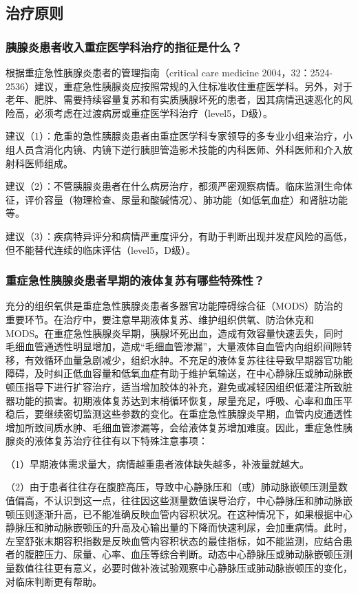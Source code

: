 \subsection{治疗原则}

\subsubsection{胰腺炎患者收入重症医学科治疗的指征是什么？}

根据重症急性胰腺炎患者的管理指南（critical care medicine
2004，32：2524-2536）建议，重症急性胰腺炎应按照常规的入住标准收住重症医学科。另外，对于老年、肥胖、需要持续容量复苏和有实质胰腺坏死的患者，因其病情迅速恶化的风险高，必须考虑在过渡病房或重症医学科治疗（level5，D级）。

建议（1）：危重的急性胰腺炎患者由重症医学科专家领导的多专业小组来治疗，小组人员含消化内镜、内镜下逆行胰胆管造影术技能的内科医师、外科医师和介入放射科医师组成。

建议（2）：不管胰腺炎患者在什么病房治疗，都须严密观察病情。临床监测生命体征，评价容量（物理检查、尿量和酸碱情况）、肺功能（如低氧血症）和肾脏功能等。

建议（3）：疾病特异评分和病情严重度评分，有助于判断出现并发症风险的高低，但不能替代连续的临床评估（level5，D级）。

\subsubsection{重症急性胰腺炎患者早期的液体复苏有哪些特殊性？}

充分的组织氧供是重症急性胰腺炎患者多器官功能障碍综合征（MODS）防治的重要环节。在治疗中，要注意早期液体复苏、维护组织供氧、防治休克和MODS。在重症急性胰腺炎早期，胰腺坏死出血，造成有效容量快速丢失，同时毛细血管通透性明显增加，造成“毛细血管渗漏”，大量液体自血管内向组织间隙转移，有效循环血量急剧减少，组织水肿。不充足的液体复苏往往导致早期器官功能障碍，及时纠正低血容量和低氧血症有助于维护氧输送，在中心静脉压或肺动脉嵌顿压指导下进行扩容治疗，适当增加胶体的补充，避免或减轻因组织低灌注所致脏器功能的损害。初期液体复苏达到末梢循环恢复，尿量充足，呼吸、心率和血压平稳后，要继续密切监测这些参数的变化。在重症急性胰腺炎早期，血管内皮通透性增加所致间质水肿、毛细血管渗漏等，会给液体复苏增加难度。因此，重症急性胰腺炎的液体复苏治疗往往有以下特殊注意事项：

（1）早期液体需求量大，病情越重患者液体缺失越多，补液量就越大。

（2）由于患者往往存在腹腔高压，导致中心静脉压和（或）肺动脉嵌顿压测量数值偏高，不认识到这一点，往往因这些测量数值误导治疗，中心静脉压和肺动脉嵌顿压则逐渐升高，已不能准确反映血管内容积状况。在这种情况下，如果根据中心静脉压和肺动脉嵌顿压的升高及心输出量的下降而快速利尿，会加重病情。此时，左室舒张末期容积指数是反映血管内容积状态的最佳指标，如不能监测，应结合患者的腹腔压力、尿量、心率、血压等综合判断。动态中心静脉压或肺动脉嵌顿压测量数值往往更有意义，必要时做补液试验观察中心静脉压或肺动脉嵌顿压的变化，对临床判断更有帮助。

